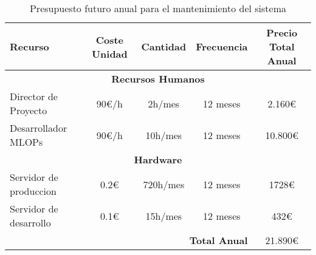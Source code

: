 \begin{table}[ht]
    \centering
    \begin{tabular}[ht]{l|c|c|c|c}
        \textbf{Recurso}           & \textbf{Coste Unidad} & \textbf{Cantidad} & \textbf{Frecuencia} & \textbf{Precio Total Anual} \\
        \hline
        \multicolumn{5}{c}{\textbf{Recursos Humanos}} \\
        \hline
        Director de Proyecto        & 90\euro/h             & 2h/mes            & 12 meses           & 2.160\euro \\
        Desarrollador MLOPs         & 90\euro/h             & 10h/mes           & 12 meses           & 10.800\euro \\
        \hline
        \multicolumn{5}{c}{\textbf{Hardware}} \\
        \hline
        Servidor de produccion       & 0.2\euro              & 720h/mes         & 12 meses           & 1728\euro   \\
        Servidor de desarrollo       & 0.1\euro              & 15h/mes          & 12 meses           & 432\euro   \\
        \multicolumn{4}{r|}{\textbf{Total Anual}} & 21.890\euro \\
    \end{tabular}
    \caption{Presupuesto futuro anual para el mantenimiento del sistema}
    \label{tab:future-budget}
\end{table}

\pagebreak